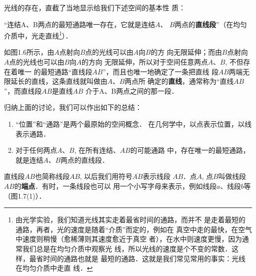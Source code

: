 光线的存在，直截了当地显示给我们下述空间的基本性
质：

“连结A、B两点的最短通路唯一存在，它就是连结$A$、
$B$两点的\textbf{直线段}”（在均匀介质中，光走直线\footnote{由光学实验，我们知道光线其实走着最省时间的通路，而并不
	是走着最短的通路，再者，光的速度是随着“介质”而定的，例如在
	真空中走的最快，在空气中速度则稍慢（愈稀薄则其速度愈近于真空
	者），在水中则速度更慢，因为通常我们总是在均匀介质中观察光
	线，所以光线的速度是个不变的常数．这样，最省时间的通路也就是
	最短的通路．这就是我们常见常用的事实：光线在均匀介质中走直
	线．}）．

\begin{figure}[htp]
	\centering
{}
	\caption{}
\end{figure}


如图1.6所示，由$A$点射向$B$点的光线可以由$A$向$B$的方
向无限延伸；而由$B$点射向$A$点的光线也可以由$B$向$A$的方向
无限延伸，所以对于空间任意两点$A$、$B$, 不但存在着唯一
的最短通路“直线段$AB$”，而且也唯一地确定了一条把直线
段$AB$两端无限延长的直线，这条直线就叫做由$A$、$B$两点所
确定的\textbf{直线}，通常称为“直线$AB$”，而直线段$AB$是直线$AB$
介于A、B两点之间的那一段．

归纳上面的讨论，我们可以作出如下的总结：

\begin{enumerate}
	\item “位置”和“通路”是两个最原始的空间概念．
在几何学中，以点表示位置，以线表示通路．
\item 对于任何两点$A$、$B$, 在所有连结、$AB$的可能通路
中，存在唯一的最短通路，就是连结$A$、$B$两点的直线段．
\end{enumerate}

直线段$AB$也简称线段$AB$, 以后我们用符号$\overline{AB}$表示线段
$AB$．点$A$, 点$B$叫做线段$AB$的\textbf{端点}．有时，一条线段也可以
用一个小写字母来表示，例如线段$a$、线段$b$等（图1.7(1)）．

